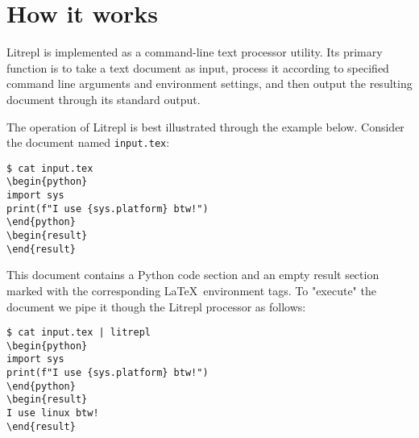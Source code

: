 \documentclass[letterpaper,12pt,twocolumn]{article}
\newcommand{\Latex}{\LaTeX\ }
\begin{document}
\section{How it works}

Litrepl is implemented as a command-line text processor utility. Its primary
function is to take a text document as input, process it according to specified
command line arguments and environment settings, and then output the resulting
document through its standard output.

The operation of Litrepl is best illustrated through the example below. Consider
the document named \verb|input.tex|:

\begin{comment}
\begin{sh}
echo '\begin{verbatim}'
echo '$ cat input.tex'
cat input.tex
echo '\end{verbatim}'
\end{sh}
\end{comment}
\begin{verbatim}
$ cat input.tex
\begin{python}
import sys
print(f"I use {sys.platform} btw!")
\end{python}
\begin{result}
\end{result}
\end{verbatim}

This document contains a Python code section and an empty result section marked
with the corresponding \Latex environment tags. To "execute" the document we
pipe it though the Litrepl processor as follows:

\begin{comment}
\begin{sh}
echo '\begin{verbatim}'
echo '$ cat input.tex | litrepl'
echo "sys.platform='linux'" | litrepl repl python >/dev/null
cat input.tex | litrepl
echo '\end{verbatim}'
\end{sh}
\end{comment}
\begin{verbatim}
$ cat input.tex | litrepl
\begin{python}
import sys
print(f"I use {sys.platform} btw!")
\end{python}
\begin{result}
I use linux btw!
\end{result}
\end{verbatim}
\end{document}
